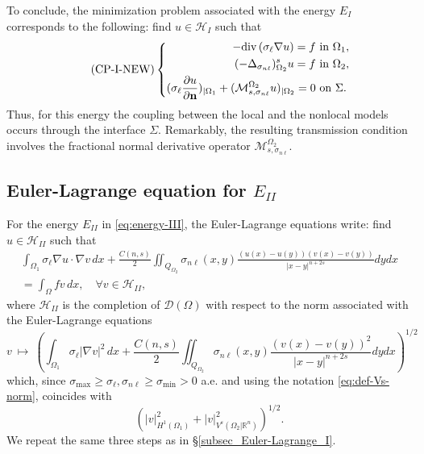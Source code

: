 \documentclass{amsart}
\newcommand{\Ol}{\Omega_{1}}%
\newcommand{\Onl}{\Omega_{2}}%
\renewcommand{\sl}{{\sigma_\ell}}
\newcommand{\snl}{{\sigma_{n\ell}}}
\def\vn{{\mathbf n}}
\def\Om{\Omega}
\def\R{{\mathbb R}}
\newcommand{\Msnl}{\mathcal{M}_{s,\snl}}
\renewcommand{\div}{{\rm div}\,}
\theoremstyle{plain}
\numberwithin{equation}{section}
\numberwithin{table}{section}
\numberwithin{figure}{section}
\numberwithin{theorem}{section}
\numberwithin{corollary}{section}
\numberwithin{definition}{section}
\numberwithin{lemma}{section}
\numberwithin{proposition}{section}
\numberwithin{remark}{section}
\begin{document}
To conclude, the minimization problem associated with the energy $E_I$ corresponds to the following:
find $u\in \mathcal{H}_{I}$ such that
\begin{equation}\label{eq:coupled_problemI_NEW} \tag{CP-I-NEW}
 \left\lbrace \begin{aligned}
-\div (\sl \nabla u) = f  & \mbox{ in } \Ol, \\
(-\Delta_\snl)^s_{\Onl} u = f  & \mbox{ in } \Onl, \\
(\sl \frac{\partial u}{\partial \vn})_{|\Ol} + (\Msnl^{\Om_2} u)_{|\Onl} = 0 & \mbox{ on } \Sigma.
\end{aligned} \right.
\end{equation}
Thus, for this energy the coupling between the local and the nonlocal models occurs through the interface $\Sigma$. Remarkably, the resulting transmission condition involves the fractional normal derivative operator $\Msnl^{\Om_2}$.


\subsection{Euler-Lagrange equation for $E_{II}$}\label{subsec_Euler-Lagrange_III}
For the energy $E_{II}$ in \eqref{eq:energy-III}, the Euler-Lagrange equations write: find $u\in \mathcal{H}_{II}$ such that
\begin{equation} \label{eq:weak-EIIv3} \begin{aligned}
\int_{\Ol}  \sl \nabla u \cdot \nabla v\, dx + \frac{C(n,s)}{2}  \iint_{Q_{\Onl}} \snl(x,y) \frac{(u(x)-u(y))(v(x)-v(y))}{|x-y|^{n+2s}} dy dx\\ 
= \int_\Omega f v \, dx, \quad \forall v \in \mathcal{H}_{II},
\end{aligned} \end{equation}
where $\mathcal{H}_{II}$ is the completion of ${\mathcal D}(\Om)$ with respect to the norm associated with the Euler-Lagrange equations
\begin{equation} \label{eq:norm-EII}
v \ \mapsto\ \left(  \int_{\Ol} \sl |\nabla v|^2\, dx + \frac{C(n,s)}{2} \iint_{Q_{\Onl}} \snl(x,y) \frac{(v(x)-v(y))^2}{|x-y|^{n+2s}} dy dx\right)^{1/2}
\end{equation}
which, since $\sigma_{\max}\ge\sl, \snl \ge\sigma_{\min}>0$ a.e. and using the notation \eqref{eq:def-Vs-norm}, coincides with
\[
\left( | v |_{H^1(\Ol)}^2 + | v |_{V^s(\Onl | \R^n)}^2 \right)^{1/2} .
\]
We repeat the same three steps as in \S\ref{subsec_Euler-Lagrange_I}.
\smallskip
\end{document}
